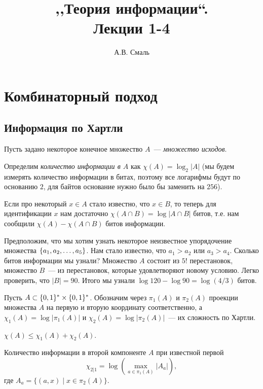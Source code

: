 \documentclass[12pt]{article}
\title{,,Теория информации``.\\ Лекции 1-4}
\author{А.В. Смаль}
\begin{document}
\maketitle

\section{Комбинаторный подход}
\subsection{Информация по Хартли}
Пусть задано некоторое конечное множество \(A\)~--- \emph{множество исходов}.
\begin{definition}[1928]
Определим \emph{количество информации в \(A\)} как \(\chi(A) = \log_2|A|\) (мы будем измерять количество информации в битах, поэтому все логарифмы будут по основанию \(2\), для байтов основание нужно было бы заменить на \(256\)).
\end{definition}

Если про некоторый \(x\in A\) стало известно, что \(x\in B\), то теперь для идентификации \(x\) нам достаточно \(\chi(A\cap B) = \log |A\cap B|\) битов, т.е. нам сообщили \(\chi(A) - \chi(A\cap B)\) битов информации.

\begin{example}
    Предположим, что мы хотим узнать некоторое неизвестное упорядочение множества $\{{a}_1,{a}_2,\dotsc,{a}_{5}\}$. Нам стало известно,
    что \(a_1>a_2\) или \(a_3>a_4\). Сколько битов информации мы узнали? Множество \(A\) состоит из \(5!\) перестановок,
    множество \(B\)~--- из перестановок, которые удовлетворяют новому условию. Легко проверить, что \(|B| = 90\). Итого
    мы узнали \(\log 120 - \log 90 = \log(4/3)\) битов.
\end{example}

Пусть \(A\subset\{0,1\}^*\times\{0,1\}^*\). Обозначим через \(\pi_1(A)\) и \(\pi_2(A)\) проекции множества \(A\) на первую и вторую координату соответственно, а \(\chi_1(A) = \log|\pi_1(A)|\) и \(\chi_2(A) = \log|\pi_2(A)|\)~--- их сложность по Хартли.

\begin{theorem} 
\(\chi(A) \le \chi_1(A) + \chi_2(A)\).
\end{theorem}

\begin{definition}
Количество информации в второй компоненте \(A\) при известной первой
\[\chi_{2|1} = \log\left(\max_{a\in\pi_1(A)} |A_a|\right),\]
где $A_a = \{(a, x) \mid x\in \pi_2(A)\}$.
\end{definition}
\end{document}

